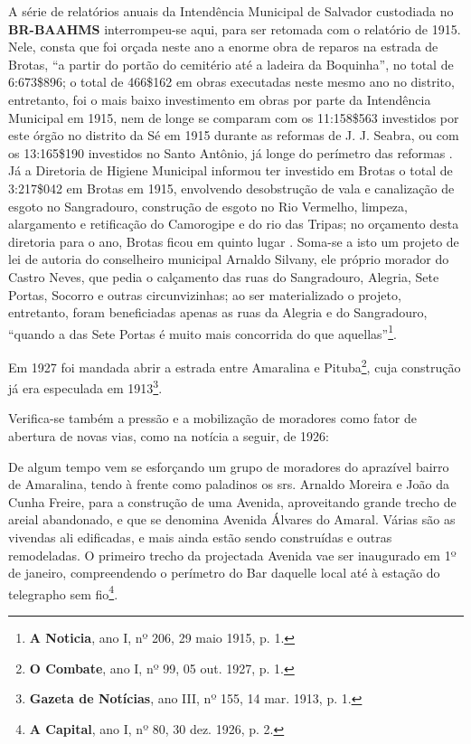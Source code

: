 A série de relatórios anuais da Intendência Municipal de Salvador custodiada no \textbf{BR-BAAHMS} interrompeu-se aqui, para ser retomada com o relatório de 1915. Nele, consta que foi orçada neste ano a enorme obra de reparos na estrada de Brotas, “a partir do portão do cemitério até a ladeira da Boquinha”, no total de 6:673\$896; o total de 466\$162 em obras executadas neste mesmo ano no distrito, entretanto, foi o mais baixo investimento em obras por parte da Intendência Municipal em 1915, nem de longe se comparam com os 11:158\$563 investidos por este órgão no distrito da Sé em 1915 durante as reformas de J. J. Seabra, ou com os 13:165\$190 investidos no Santo Antônio, já longe do perímetro das reformas \cite[pp.~127-128]{salvador_relatorio_1916}. Já a Diretoria de Higiene Municipal informou ter investido em Brotas o total de 3:217\$042 em Brotas em 1915, envolvendo desobstrução de vala e canalização de esgoto no Sangradouro, construção de esgoto no Rio Vermelho, limpeza, alargamento e retificação do Camorogipe e do rio das Tripas; no orçamento desta diretoria para o ano, Brotas ficou em quinto lugar \cite[pp.~195-196]{salvador_relatorio_1916}. Soma-se a isto um projeto de lei de autoria do conselheiro municipal Arnaldo Silvany, ele próprio morador do Castro Neves, que pedia o calçamento das ruas do Sangradouro, Alegria, Sete Portas, Socorro e outras circunvizinhas; ao ser materializado o projeto, entretanto, foram beneficiadas apenas as ruas da Alegria e do Sangradouro, ``quando a das Sete Portas é muito mais concorrida do que aquellas''\footnote{\textbf{A Noticia}, ano I, nº 206, 29 maio 1915, p. 1.}.

Em 1927 foi mandada abrir a estrada entre Amaralina e Pituba\footnote{\textbf{O Combate}, ano I, nº 99, 05 out. 1927, p. 1.}, cuja construção já era especulada em 1913\footnote{\textbf{Gazeta de Notícias}, ano III, nº 155, 14 mar. 1913, p. 1.}.

Verifica-se também a pressão e a mobilização de moradores como fator de abertura de novas vias, como na notícia a seguir, de 1926:

\begin{citacao}
De algum tempo vem se esforçando um grupo de moradores do aprazível bairro de Amaralina, tendo à frente como paladinos os srs. Arnaldo Moreira e João da Cunha Freire, para a construção de uma Avenida, aproveitando grande trecho de areial abandonado, e que se denomina Avenida Álvares do Amaral.
Várias são as vivendas ali edificadas, e mais ainda estão sendo construídas e outras remodeladas.
O primeiro trecho da projectada Avenida vae ser inaugurado em 1º de janeiro, compreendendo o perímetro do Bar daquelle local até à estação do telegrapho sem fio\footnote{\textbf{A Capital}, ano I, nº 80, 30 dez. 1926, p. 2. }.
\end{citacao}

